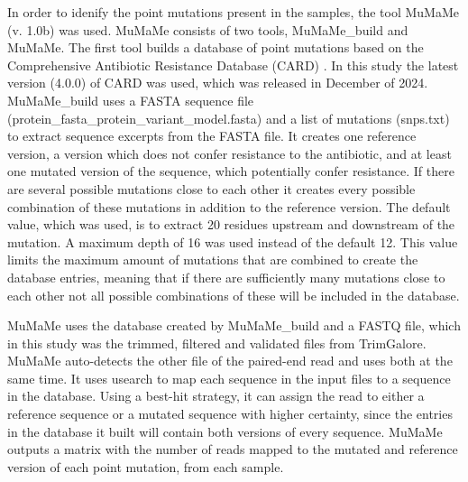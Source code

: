 In order to idenify the point mutations present in the samples, the tool MuMaMe (v. 1.0b) \cite{magesh2019MumameSoftwareTool} was used. MuMaMe consists of two tools, MuMaMe\_build and MuMaMe. 
The first tool builds a database of point mutations based on the Comprehensive Antibiotic Resistance Database (CARD) \cite{alcock2023CARD2023Expanded}. In this study the latest version (4.0.0) of CARD was used, which was released in December of 2024.
MuMaMe\_build uses a FASTA sequence file (protein\_fasta\_protein\_variant\_model.fasta) and a list of mutations (snps.txt) to extract sequence excerpts from the FASTA file. It creates one reference version, a version which does not confer resistance to the antibiotic, and at least one mutated version of the sequence, which potentially confer resistance. 
If there are several possible mutations close to each other it creates every possible combination of these mutations in addition to the reference version. 
The default value, which was used, is to extract 20 residues upstream and downstream of the mutation. 
A maximum depth of 16 was used instead of the default 12. This value limits the maximum amount of mutations that are combined to create the database entries, 
meaning that if there are sufficiently many mutations close to each other not all possible combinations of these will be included in the database.

MuMaMe uses the database created by MuMaMe\_build and a FASTQ file, which in this study was the trimmed, filtered and validated files from TrimGalore. MuMaMe auto-detects the other file of the paired-end read and uses both at the same time. It uses usearch \cite{edgar2010SearchClusteringOrders} to map each sequence in the input files to a sequence in the database. Using a best-hit strategy, it can assign the read to either a reference sequence or a mutated sequence with higher certainty, since the entries in the database it built will contain both versions of every sequence.
MuMaMe outputs a matrix with the number of reads mapped to the mutated and reference version of each point mutation, from each sample.

% 

